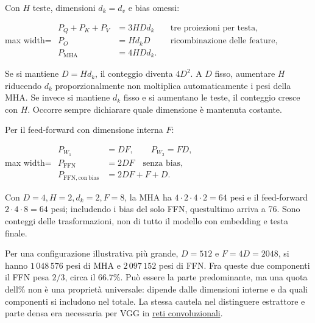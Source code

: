 \documentclass[11pt,a4paper,oneside,openany]{book}
\begin{document}
Con \(H\) teste, dimensioni \(d_k=d_v\) e bias omessi:

\begin{center}
\begin{adjustbox}{max width=\linewidth}
$\displaystyle 
\begin{aligned}
P_Q+P_K+P_V&=3HDd_k &&\text{tre proiezioni per testa},\\
P_O&=Hd_kD &&\text{ricombinazione delle feature},\\
\boxed{P_{\mathrm{MHA}}}&=\boxed{4HDd_k.}
\end{aligned}
$
\end{adjustbox}
\end{center}

Se si mantiene \(D=Hd_k\), il conteggio diventa \(4D^2\). A \(D\) fisso, aumentare \(H\) riducendo \(d_k\) proporzionalmente non moltiplica automaticamente i pesi della MHA. Se invece si mantiene \(d_k\) fisso e si aumentano le teste, il conteggio cresce con \(H\). Occorre sempre dichiarare quale dimensione è mantenuta costante.

Per il feed-forward con dimensione interna \(F\):

\begin{center}
\begin{adjustbox}{max width=\linewidth}
$\displaystyle 
\begin{aligned}
P_{W_1}&=DF,\qquad P_{W_2}=FD,\\
\boxed{P_{\mathrm{FFN}}}&=\boxed{2DF}\quad\text{senza bias},\\
P_{\mathrm{FFN,con\ bias}}&=2DF+F+D.
\end{aligned}
$
\end{adjustbox}
\end{center}

Con \(D=4,H=2,d_k=2,F=8\), la MHA ha \(4\cdot2\cdot4\cdot2=64\) pesi e il feed-forward \(2\cdot4\cdot8=64\) pesi; includendo i bias del solo FFN, quest\textquotesingle ultimo arriva a 76. Sono conteggi delle trasformazioni, non di tutto il modello con embedding e testa finale.

Per una configurazione illustrativa più grande, \(D=512\) e \(F=4D=2048\), si hanno \(1\,048\,576\) pesi di MHA e \(2\,097\,152\) pesi di FFN. Fra queste due componenti il FFN pesa \(2/3\), circa il 66.7\%. Può essere la parte predominante, ma una quota dell\% non è una proprietà universale: dipende dalle dimensioni interne e da quali componenti si includono nel totale. La stessa cautela nel distinguere estrattore e parte densa era necessaria per VGG in \hyperref[fonte02]{reti convoluzionali}.
\end{document}
